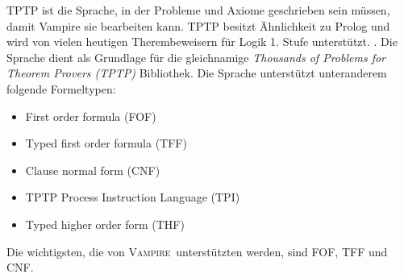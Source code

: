 \documentclass{article}
\newcommand{\vampire}{\textsc{Vampire}~}
\begin{document}
TPTP ist die Sprache, in der Probleme und Axiome geschrieben sein müssen, damit Vampire sie bearbeiten kann. TPTP besitzt Ähnlichkeit zu Prolog und wird von vielen heutigen Therembeweisern für Logik 1. Stufe unterstützt. \cite[S. 4]{cav2013}. Die Sprache dient als Grundlage für die gleichnamige \textit{Thousands of Problems for Theorem Provers (TPTP)} Bibliothek. Die Sprache unterstützt unteranderem folgende Formeltypen:
\begin{itemize}
	\item First order formula (FOF)
	\item Typed first order formula (TFF)
	\item Clause normal form (CNF)
	\item TPTP Process Instruction Language  (TPI)
	\item Typed higher order form (THF)
\end{itemize}
Die wichtigsten, die von \vampire unterstützten werden, sind FOF, TFF und CNF.
\end{document}
